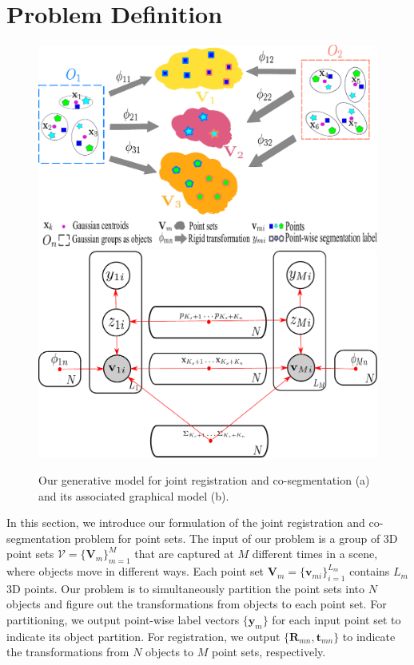 \section{Problem Definition}
\label{sec:method}


\begin{figure}[htb]
	\centering
	\includegraphics[width=0.45\linewidth]{images/formulation}
	\hspace{0.1\linewidth}
	\includegraphics[width=0.40\linewidth]{images/formulation2}
	\caption{Our generative model for joint registration and co-segmentation (a) and its associated graphical model (b). 
	} 
	\label{fig:formulation}
\end{figure}

In this section, we introduce our formulation of the joint registration and co-segmentation problem for point sets. 
The input of our problem is a group of 3D point sets  $\mathcal{V}=\{\mathbf{V}_m\}^{M}_{m=1}$ that are captured at $M$ different times in a scene, where objects move in different ways. Each point set $\mathbf{V}_m=\{\mathbf{v}_{mi}\}^{L_m}_{i=1}$ contains $L_m$ 3D points. Our problem is to simultaneously partition the point sets into $N$ objects and figure out the transformations from objects to each point set. For partitioning, we output point-wise label vectors $\{\mathbf{y}_m\}$ for each input point set to indicate its object partition. For registration, we output $\{\mathbf{R}_{mn},\mathbf{t}_{mn}\}$ to indicate the transformations from $N$ objects to $M$ point sets, respectively.

